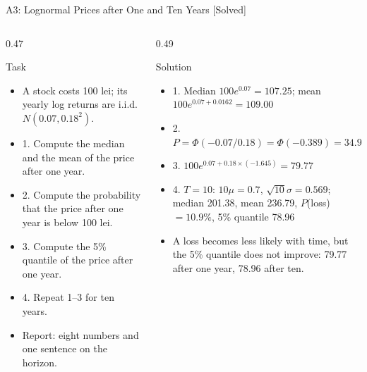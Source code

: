 \begin{frame}{A3: Lognormal Prices after One and Ten Years [Solved]}
\itemsize{\scriptsize}
\begin{columns}[T]
\begin{column}{0.47\textwidth}
\begin{block}{Task}
\begin{itemize}
    \item A stock costs 100 lei; its yearly log returns are i.i.d. $N(0.07, 0.18^2)$.
    \item 1. Compute the median and the mean of the price after one year.
    \item 2. Compute the probability that the price after one year is below 100 lei.
    \item 3. Compute the 5\% quantile of the price after one year.
    \item 4. Repeat 1--3 for ten years.
    \item Report: eight numbers and one sentence on the horizon.
\end{itemize}
\end{block}
\end{column}
\begin{column}{0.49\textwidth}
\begin{exampleblock}{Solution}
\begin{itemize}
    \item 1. Median $100e^{0.07} = 107.25$; mean $100e^{0.07 + 0.0162} = 109.00$
    \item 2. $P = \Phi(-0.07/0.18) = \Phi(-0.389) = 34.9\%$
    \item 3. $100e^{0.07 + 0.18 \times (-1.645)} = 79.77$
    \item 4. $T = 10$: $10\mu = 0.7$, $\sqrt{10}\sigma = 0.569$; median 201.38, mean 236.79, $P$(loss) $= 10.9\%$, 5\% quantile 78.96
    \item A loss becomes less likely with time, but the 5\% quantile does not improve: 79.77 after one year, 78.96 after ten.
\end{itemize}
\end{exampleblock}
\end{column}
\end{columns}
\end{frame}

